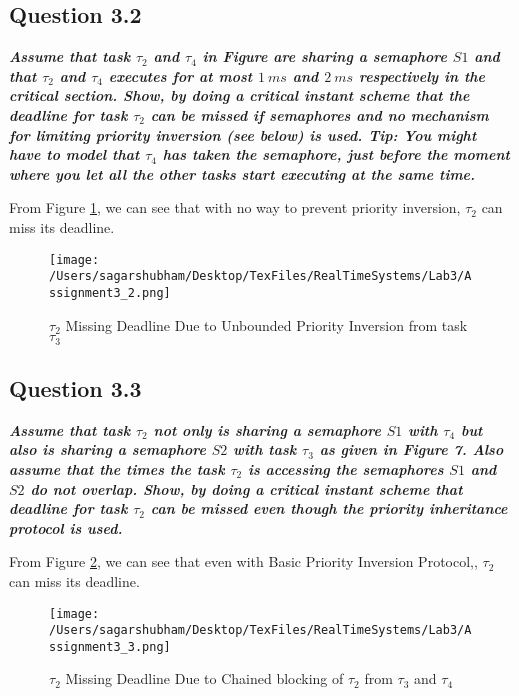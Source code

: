 \documentclass[oneside,a4paper]{article}
\begin{document}
\subsection*{\normalsize{Question 3.2}}
\textbf{\textit{Assume that task $\tau_2$ and $\tau_4$ in Figure are sharing a semaphore $S1$ and that $\tau_2$ and $\tau_4$ executes for at most $1\ ms$ and $2\ ms$ respectively in the critical section. Show, by doing a critical instant scheme that the deadline for task $\tau_2$ can be missed if semaphores and no mechanism for limiting priority inversion (see below) is used. Tip: You might have to model that $\tau_4$ has taken the semaphore, just before the moment where you let all the other tasks start executing at the same time.
}}\par
From Figure \ref{fig3_2}, we can see that with no way to prevent priority inversion, $\tau_2$ can miss its deadline.
\begin{center}
\begin{figure}[H]
                    \centering
                    \texttt{[image: /Users/sagarshubham/Desktop/TexFiles/RealTimeSystems/Lab3/Assignment3\_2.png]}
                    \caption[Figure for Question 3.2]{$\tau_2$ Missing Deadline Due to Unbounded Priority Inversion from task $\tau_3$}
                    \label{fig3_2}        
\end{figure}
\end{center}\par
\pagebreak
\subsection*{\normalsize{Question 3.3}}
\textit{\textbf{Assume that task $\tau_2$ not only is sharing a semaphore $S1$ with $\tau_4$ but also is sharing a semaphore $S2$ with task $\tau_3$ as given in Figure 7. Also assume that the times the task $\tau_2$ is accessing the semaphores $S1$ and $S2$ do not overlap. Show, by doing a critical instant scheme that deadline for task $\tau_2$ can be missed even though the priority inheritance protocol is used.}}\par
From Figure \ref{fig3_3}, we can see that even with Basic Priority Inversion Protocol,, $\tau_2$ can miss its deadline.
\begin{center}
\begin{figure}[H]
                    \centering
                    \texttt{[image: /Users/sagarshubham/Desktop/TexFiles/RealTimeSystems/Lab3/Assignment3\_3.png]}
                    \caption[Figure for Question 3.3]{$\tau_2$ Missing Deadline Due to Chained blocking of $\tau_2$ from $\tau_3$ and $\tau_4$}
                    \label{fig3_3}        
\end{figure}
\end{center}\par
\pagebreak
\end{document}
